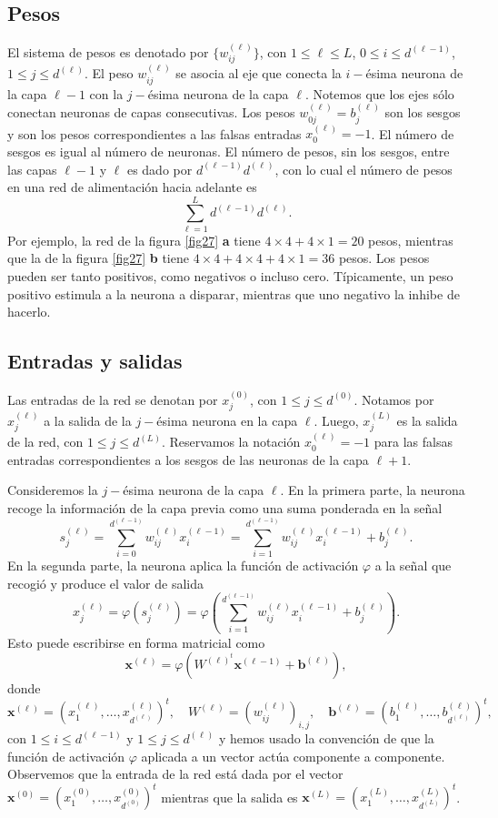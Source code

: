 \documentclass[12pt, a4paper]{amsbook}
\newcommand{\xx}{{\mathbf x}}
\newcommand{\bb}{{\mathbf b}}
\theoremstyle{remark}
\theoremstyle{definition}
\numberwithin{section}{chapter}
\numberwithin{subsection}{section}
\numberwithin{equation}{section}
\numberwithin{figure}{chapter}
\begin{document}
\subsection*{Pesos} El sistema de pesos es denotado por $\{w_{ij}^{(\ell)}\}$, con $1\le \ell\le L$, $0\le i\le d^{(\ell-1)}$, $1\le j\le d^{(\ell)}$. El peso $w_{ij}^{(\ell)}$ se asocia al eje que conecta la $i-$ésima neurona de la capa $\ell-1$ con la $j-$ésima neurona de la capa $\ell$. Notemos que los ejes sólo conectan neuronas de capas consecutivas. Los pesos $w_{0j}^{(\ell)} = b_j^{(\ell)}$ son los sesgos y son los pesos correspondientes a las falsas entradas $x_0^{(\ell)} = -1$. El número de sesgos es igual al número de neuronas. El número de pesos, sin los sesgos, entre las capas $\ell-1$ y $\ell$ es dado por $d^{(\ell-1)}d^{(\ell)}$, con lo cual el número de pesos en una red de alimentación hacia adelante es 
$$
\sum_{\ell=1}^L  d^{(\ell-1)}d^{(\ell)}.
$$
Por ejemplo, la red de la figura \ref{fig27} {\bf a} tiene $4\times 4 + 4\times 1 = 20$ pesos, mientras que la de la figura \ref{fig27} {\bf b} tiene $4\times 4 +4\times 4 + 4\times 1 = 36$ pesos. Los pesos pueden ser tanto positivos, como negativos o incluso cero. Típicamente, un peso positivo estimula a la neurona a disparar, mientras que uno negativo la inhibe de hacerlo.

\subsection*{Entradas y salidas} Las entradas de la red se denotan por $x_j^{(0)}$, con $1\le j\le d^{(0)}$. Notamos por $x_j^{(\ell)}$ a la salida de la $j-$ésima neurona en la capa $\ell$. Luego, $x_j^{(L)}$ es la salida de la red, con $1\le j\le d^{(L)}$. Reservamos la notación $x_0^{(\ell)} = -1$ para las falsas entradas correspondientes a los sesgos de las neuronas de la capa $\ell+1$.

Consideremos la $j-$ésima neurona de la capa $\ell$.  En la primera parte, la neurona recoge la información de la capa previa como una suma ponderada en la señal
$$
s_j^{(\ell)} = \sum_{i=0}^{d^{(\ell-1)}} w_{ij}^{(\ell)} x_i^{(\ell-1)} = \sum_{i=1}^{d^{(\ell-1)}} w_{ij}^{(\ell)} x_i^{(\ell-1)} + b_j^{(\ell)}.
$$
En la segunda parte, la neurona aplica la función de activación $\varphi$ a la señal que recogió y produce el valor de salida
\begin{equation}\label{salida.neurona}
x_j^{(\ell)} = \varphi(s_j^{(\ell)}) = \varphi\left(\sum_{i=1}^{d^{(\ell-1)}} w_{ij}^{(\ell)} x_i^{(\ell-1)} + b_j^{(\ell)}\right).
\end{equation}
Esto puede escribirse en forma matricial como
$$
\xx^{(\ell)} = \varphi(W^{(\ell)^t} \xx^{(\ell-1)} + \bb^{(\ell)}),
$$
donde
$$
\xx^{(\ell)} = (x_1^{(\ell)},\dots, x_{d^{(\ell)}}^{(\ell)})^t, \quad W^{(\ell)} = \left( w_{ij}^{(\ell)}\right)_{i,j},\quad \bb^{(\ell)} = (b_1^{(\ell)},\dots, b_{d^{(\ell)}}^{(\ell)})^t,
$$
con $1\le i\le d^{(\ell-1)}$ y $1\le j\le d^{(\ell)}$ y hemos usado la convención de que la función de activación $\varphi$ aplicada a un vector actúa componente a componente. Observemos que la entrada de la red está dada por el vector $\xx^{(0)} =  (x_1^{(0)},\dots, x_{d^{(0)}}^{(0)})^t$ mientras que la salida es $ \xx^{(L)} = (x_1^{(L)},\dots, x_{d^{(L)}}^{(L)})^t$.
\end{document}
